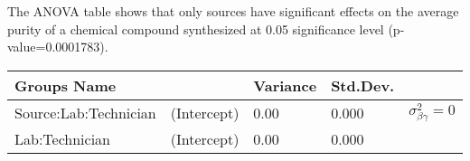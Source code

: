 \documentclass[12pt,]{article}
\begin{document}
The ANOVA table shows that only sources have significant effects on the
average purity of a chemical compound synthesized at 0.05 significance
level (p-value=0.0001783).

\begin{longtable}[]{@{}lllll@{}}
\toprule
\begin{minipage}[b]{0.25\columnwidth}\raggedright
Groups Name\strut
\end{minipage} & \begin{minipage}[b]{0.13\columnwidth}\raggedright
\strut
\end{minipage} & \begin{minipage}[b]{0.09\columnwidth}\raggedright
Variance\strut
\end{minipage} & \begin{minipage}[b]{0.09\columnwidth}\raggedright
Std.Dev.\strut
\end{minipage} & \begin{minipage}[b]{0.28\columnwidth}\raggedright
\strut
\end{minipage}\tabularnewline
\midrule
\endhead
\begin{minipage}[t]{0.25\columnwidth}\raggedright
Source:Lab:Technician\strut
\end{minipage} & \begin{minipage}[t]{0.13\columnwidth}\raggedright
(Intercept)\strut
\end{minipage} & \begin{minipage}[t]{0.09\columnwidth}\raggedright
0.00\strut
\end{minipage} & \begin{minipage}[t]{0.09\columnwidth}\raggedright
0.000\strut
\end{minipage} & \begin{minipage}[t]{0.28\columnwidth}\raggedright
\(\sigma^2_{\beta\gamma}=0\)\strut
\end{minipage}\tabularnewline
\begin{minipage}[t]{0.25\columnwidth}\raggedright
Lab:Technician\strut
\end{minipage} & \begin{minipage}[t]{0.13\columnwidth}\raggedright
(Intercept)\strut
\end{minipage} & \begin{minipage}[t]{0.09\columnwidth}\raggedright
0.00\strut
\end{minipage} & \begin{minipage}[t]{0.09\columnwidth}\raggedright
0.000\strut
\end{minipage} & \begin{minipage}[t]{0.28\columnwidth}\raggedright

\end{minipage}
\end{longtable}
\end{document}
